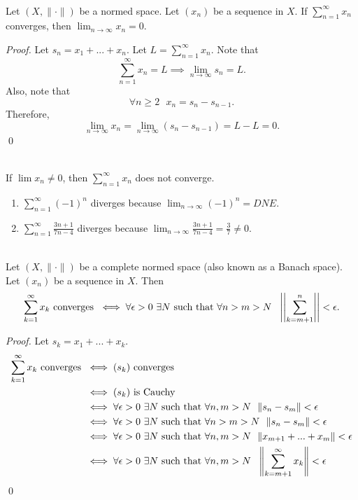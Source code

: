 \begin{theorem} \leavevmode \\
    \label{thm3.23}
    Let $\left(X, \| \cdot \|\right)$ be a normed space. Let $(x_n)$ be a sequence in $X$. If $\sum_{n=1}^{\infty}x_n$ converges, then $\lim_{n \to \infty}x_n = 0.$
\end{theorem}
\begin{proof}
    Let $s_n = x_1 + ... + x_n$. Let $L = \sum_{n=1}^{\infty}x_n$. Note that
    $$\sum_{n=1}^{\infty} x_n = L \implies \lim_{n \to \infty} s_n = L.$$
    Also, note that
    $$\forall n \geq 2 ~~~ x_n = s_n - s_{n-1}.$$
    Therefore,
    $$\lim_{n \to \infty}x_n = \lim_{n \to \infty}(s_n - s_{n-1}) = L - L = 0.$$
    \qed
\end{proof}

\begin{corollary} \leavevmode \\
    If $\lim x_n \not = 0$, then $\sum_{n=1}^{\infty} x_n$ does not converge.
\end{corollary}

\begin{enumerate} [$*)$]
    \item $\sum_{n=1}^{\infty} (-1)^n$ diverges because $\lim_{n \to \infty} (-1)^n = DNE.$
    \item $\sum_{n=1}^{\infty} \frac{3n+1}{7n-4}$ diverges because $\lim_{n \to \infty} \frac{3n+1}{7n-4} = \frac{3}{7} \not = 0.$
\end{enumerate}

\begin{theorem} \leavevmode \\
    \label{thm3.22}
    Let $\left(X, \| \cdot \|\right)$ be a complete normed space (also known as a Banach space). Let $(x_n)$ be a sequence in $X$. Then
    $$\sum_{k=1}^{\infty}x_k \text{ converges } \iff \forall \epsilon > 0 ~\exists N \text{ such that } \forall n > m > N ~~\left|\left| \sum_{k=m+1}^{n}\right|\right| < \epsilon.$$
\end{theorem}
\begin{proof}
    Let $s_k = x_1 + ... + x_k.$
    \begin{align*}
        \sum_{k = 1}^{\infty}x_k \text{ converges } &\iff (s_k) \text{ converges } \\
        &\iff (s_k) \text{ is Cauchy } \\
        &\iff \forall \epsilon > 0 ~\exists N \text{ such that } \forall n,m > N ~~\|s_n - s_m \| < \epsilon \\
        &\iff \forall \epsilon > 0 ~\exists N \text{ such that } \forall n> m > N ~~\|s_n - s_m \| < \epsilon \\
        &\iff \forall \epsilon > 0 ~\exists N \text{ such that } \forall n,m > N ~~\|x_{m+1} + ... + x_m\| < \epsilon \\
        &\iff \forall \epsilon > 0 ~\exists N \text{ such that } \forall n,m > N ~~\left\|\sum_{k=m+1}^{\infty}x_k \right\| < \epsilon \\
    \end{align*}
    \qed
\end{proof}

